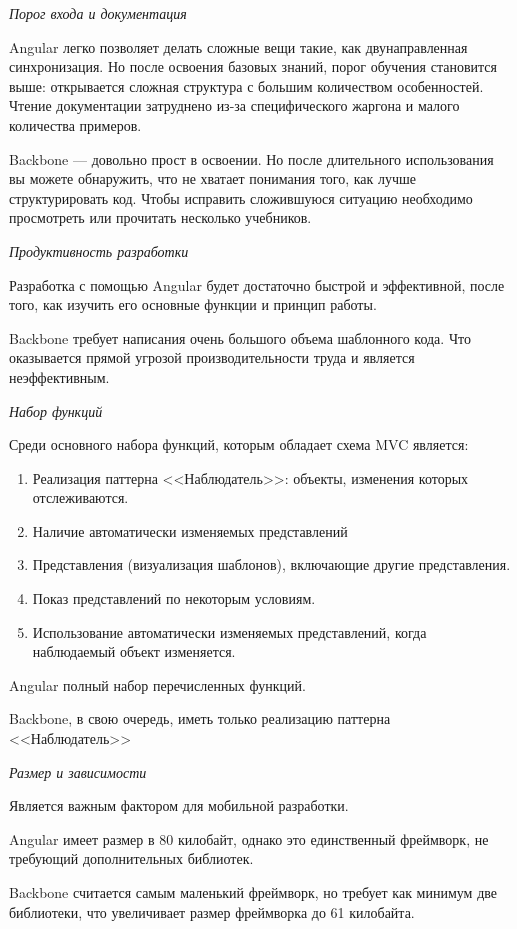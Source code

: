 {\itshape Порог входа и документация}

Angular легко позволяет делать сложные вещи такие, как двунаправленная синхронизация. Но после освоения базовых знаний, порог обучения становится выше: открывается сложная структура с большим количеством особенностей. Чтение документации затруднено из-за специфического жаргона и малого количества примеров.

Backbone — довольно прост в освоении. Но после длительного использования вы можете обнаружить, что не хватает понимания того, как лучше структурировать код. Чтобы исправить сложившуюся ситуацию необходимо просмотреть или прочитать несколько учебников. 

{\itshape Продуктивность разработки}

Разработка с помощью Angular будет достаточно быстрой и эффективной, после того, как изучить его основные функции и принцип работы.

Backbone требует написания очень большого объема шаблонного кода. Что оказывается прямой угрозой производительности труда и является неэффективным.

{\itshape Набор функций}

Среди основного набора функций, которым обладает схема MVC является:
\begin{enumerate}
\item Реализация паттерна <<Наблюдатель>>: объекты, изменения которых отслеживаются.
\item  Наличие автоматически изменяемых представлений
\item Представления (визуализация шаблонов), включающие другие представления.
\item Показ представлений по некоторым условиям.
\item Использование автоматически изменяемых представлений, когда наблюдаемый объект изменяется.
\end{enumerate}

Angular полный набор перечисленных функций.

Backbone, в свою очередь, иметь только реализацию паттерна <<Наблюдатель>>

{\itshape Размер и зависимости} 

Является важным фактором для мобильной разработки.

Angular имеет размер в 80 килобайт, однако это единственный фреймворк, не требующий дополнительных библиотек.

Backbone считается самым маленький фреймворк, но требует как минимум две библиотеки, что увеличивает размер фреймворка до 61 килобайта.


